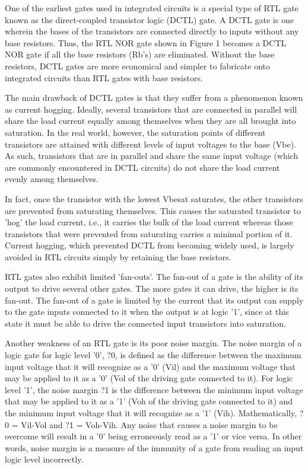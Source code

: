 One of the earliest gates used in integrated circuits is a special type of RTL gate known as the direct-coupled transistor logic (DCTL) gate.  A DCTL gate is one wherein the bases of the transistors are connected directly to inputs without any base resistors. Thus, the RTL NOR gate shown in Figure 1 becomes a DCTL NOR gate if all the base resistors (Rb's) are eliminated.  Without the base resistors, DCTL gates are more economical and simpler to fabricate onto integrated circuits than RTL gates with base resistors.



The main drawback of DCTL gates is that they suffer from a phenomenon known as current hogging.  Ideally, several transistors that are connected in parallel will share the load current equally among themselves when they are all brought into saturation.  In the real world, however, the saturation points of different transistors are attained with different levels of input voltages to the base (Vbe). As such, transistors that are in parallel and share the same input voltage (which are commonly encountered in DCTL circuits) do not share the load current evenly among themselves.



In fact, once the transistor with the lowest Vbesat saturates, the other transistors are prevented from saturating themselves.  This causes the saturated transistor to 'hog' the load current, i.e., it carries the bulk of the load current whereas those transistors that were prevented from saturating carries a minimal portion of it.  Current hogging, which prevented DCTL from becoming widely used, is largely avoided in RTL circuits simply by retaining the base resistors.



RTL gates also exhibit limited 'fan-outs'.  The fan-out of a gate is the ability of its output to drive several other gates. The more gates it can drive, the higher is its fan-out. The fan-out of a gate is limited by the current that its output can supply to the gate inputs connected to it when the output is at logic '1', since at this state it must be able to drive the connected input transistors into saturation.



Another weakness of an RTL gate is its poor noise margin. The noise margin of a logic gate for logic level '0', ?0, is defined as the difference between the maximum input voltage that it will recognize as a '0' (Vil) and the maximum voltage that may be applied to it as a '0' (Vol of the driving gate connected to it).  For logic level '1', the noise margin ?1 is the difference between the minimum input voltage that may be applied to it as a '1' (Voh of the driving gate connected to it) and the minimum input voltage that it will recognize as a '1' (Vih).  Mathematically, ?0 = Vil-Vol and ?1 = Voh-Vih. Any noise that causes a noise margin to be overcome will result in a '0' being erroneously read as a '1' or vice versa.  In other words, noise margin is a measure of the immunity of a gate from reading an input logic level incorrectly.



